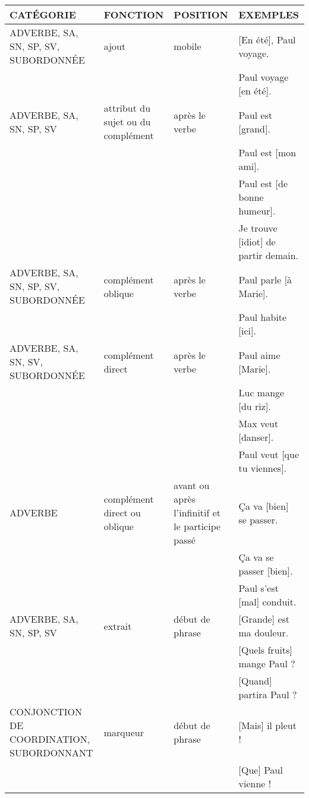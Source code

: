 \documentclass[UTF8]{report}
\begin{document}
\begin{table}[H]
    \centering
    \small
    \begin{adjustbox}{max width=\textwidth}
        \begin{tabular}{|p{3.5cm}|p{3.5cm}|p{3.5cm}|p{5cm}|}
        \hline
        \rowcolor{cyan!20}
        \textbf{CATÉGORIE} & \textbf{FONCTION} & \textbf{POSITION} & \textbf{EXEMPLES} \\
        \hline
        ADVERBE, SA, SN, SP, SV, SUBORDONNÉE & ajout & mobile & [En été], Paul voyage. \\
        & & & Paul voyage [en été]. \\
        \hline
        ADVERBE, SA, SN, SP, SV & attribut du sujet ou du complément & après le verbe & Paul est [grand]. \\
        & & & Paul est [mon ami]. \\
        & & & Paul est [de bonne humeur]. \\
        & & & Je trouve [idiot] de partir demain. \\
        \hline
        ADVERBE, SA, SN, SP, SV, SUBORDONNÉE & complément oblique & après le verbe & Paul parle [à Marie]. \\
        & & & Paul habite [ici]. \\
        \hline
        ADVERBE, SA, SN, SV, SUBORDONNÉE & complément direct & après le verbe & Paul aime [Marie]. \\
        & & & Luc mange [du riz]. \\
        & & & Max veut [danser]. \\
        & & & Paul veut [que tu viennes]. \\
        \hline
        ADVERBE & complément direct ou oblique & avant ou après l'infinitif et le participe passé & Ça va [bien] se passer. \\
        & & & Ça va se passer [bien]. \\
        & & & Paul s'est [mal] conduit. \\
        \hline
        ADVERBE, SA, SN, SP, SV & extrait & début de phrase & [Grande] est ma douleur. \\
        & & & [Quels fruits] mange Paul ? \\
        & & & [Quand] partira Paul ? \\
        \hline
        CONJONCTION DE COORDINATION, SUBORDONNANT & marqueur & début de phrase & [Mais] il pleut ! \\
        & & & [Que] Paul vienne ! \\

\end{tabular}
\end{adjustbox}
\end{table}
\end{document}
